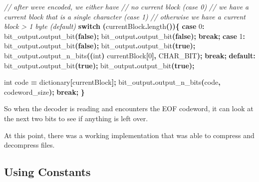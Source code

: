 \documentclass[12pt,twoside]{reedthesis}
\newenvironment{Shaded}{\begin{snugshade}}{\end{snugshade}}
\newcommand{\CommentTok}[1]{\textcolor[rgb]{0.56,0.35,0.01}{\textit{#1}}}
\newcommand{\ControlFlowTok}[1]{\textcolor[rgb]{0.13,0.29,0.53}{\textbf{#1}}}
\newcommand{\DataTypeTok}[1]{\textcolor[rgb]{0.13,0.29,0.53}{#1}}
\newcommand{\DecValTok}[1]{\textcolor[rgb]{0.00,0.00,0.81}{#1}}
\newcommand{\KeywordTok}[1]{\textcolor[rgb]{0.13,0.29,0.53}{\textbf{#1}}}
\newcommand{\NormalTok}[1]{#1}
\newcommand{\OperatorTok}[1]{\textcolor[rgb]{0.81,0.36,0.00}{\textbf{#1}}}
\begin{document}
\begin{Shaded}
\begin{Highlighting}[]
\CommentTok{// after we\textquotesingle{}ve encoded, we either have }
\CommentTok{// no current block (case 0)}
\CommentTok{// we have a current block that is a single character (case 1)}
\CommentTok{// otherwise we have a current block \textgreater{} 1 byte (default)}
\ControlFlowTok{switch} \OperatorTok{(}\NormalTok{currentBlock}\OperatorTok{.}\NormalTok{length}\OperatorTok{())\{}
\ControlFlowTok{case} \DecValTok{0}\OperatorTok{:}
\NormalTok{    bit\_output}\OperatorTok{.}\NormalTok{output\_bit}\OperatorTok{(}\KeywordTok{false}\OperatorTok{);}
\NormalTok{    bit\_output}\OperatorTok{.}\NormalTok{output\_bit}\OperatorTok{(}\KeywordTok{false}\OperatorTok{);}
    \ControlFlowTok{break}\OperatorTok{;}
\ControlFlowTok{case} \DecValTok{1}\OperatorTok{:}
\NormalTok{    bit\_output}\OperatorTok{.}\NormalTok{output\_bit}\OperatorTok{(}\KeywordTok{false}\OperatorTok{);}
\NormalTok{    bit\_output}\OperatorTok{.}\NormalTok{output\_bit}\OperatorTok{(}\KeywordTok{true}\OperatorTok{);}
\NormalTok{    bit\_output}\OperatorTok{.}\NormalTok{output\_n\_bits}\OperatorTok{((}\DataTypeTok{int}\OperatorTok{)}\NormalTok{ currentBlock}\OperatorTok{[}\DecValTok{0}\OperatorTok{],}\NormalTok{ CHAR\_BIT}\OperatorTok{);}
    \ControlFlowTok{break}\OperatorTok{;}
\ControlFlowTok{default}\OperatorTok{:}
\NormalTok{    bit\_output}\OperatorTok{.}\NormalTok{output\_bit}\OperatorTok{(}\KeywordTok{true}\OperatorTok{);}
\NormalTok{    bit\_output}\OperatorTok{.}\NormalTok{output\_bit}\OperatorTok{(}\KeywordTok{true}\OperatorTok{);}

    \DataTypeTok{int}\NormalTok{ code }\OperatorTok{=}\NormalTok{ dictionary}\OperatorTok{[}\NormalTok{currentBlock}\OperatorTok{];}
\NormalTok{    bit\_output}\OperatorTok{.}\NormalTok{output\_n\_bits}\OperatorTok{(}\NormalTok{code}\OperatorTok{,}\NormalTok{ codeword\_size}\OperatorTok{);}
    \ControlFlowTok{break}\OperatorTok{;}
\OperatorTok{\}}
\end{Highlighting}
\end{Shaded}
So when the decoder is reading and encounters the EOF codeword, it can look at the next two bits to see if anything is left over.

At this point, there was a working implementation that was able to compress and decompress files.

\hypertarget{using-constants}{%
\subsection{Using Constants}\label{using-constants}}
\end{document}
